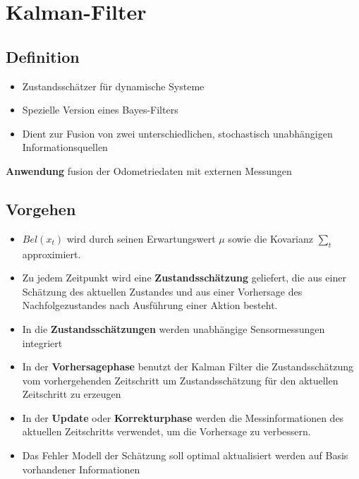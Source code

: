\section{Kalman-Filter}
\subsection{Definition}
\begin{itemize}
	\item Zustandsschätzer für dynamische Systeme
	\item Spezielle Version eines Bayes-Filters
	\item Dient zur Fusion von zwei unterschiedlichen, stochastisch unabhängigen
		Informationsquellen
\end{itemize}

\textbf{Anwendung} fusion der Odometriedaten mit externen Messungen

\subsection{Vorgehen}
\begin{itemize}
	\item $Bel(x_t)$ wird durch seinen Erwartungswert $\mu$ sowie die Kovarianz
		$\sum_t$ approximiert.
	\item Zu jedem Zeitpunkt wird eine \textbf{Zustandsschätzung} geliefert, die
		aus einer Schätzung des aktuellen Zustandes und aus einer Vorhersage des
		Nachfolgezustandes nach Ausführung einer Aktion besteht.
	\item In die \textbf{Zustandsschätzungen} werden unabhängige Sensormessungen
		integriert
	\item In der \textbf{Vorhersagephase} benutzt der Kalman Filter die
		Zustandsschätzung vom vorhergehenden Zeitschritt um Zustandsschätzung für
		den aktuellen Zeitschritt zu erzeugen
	\item In der \textbf{Update} oder \textbf{Korrekturphase} werden die
		Messinformationen des aktuellen Zeitschritts verwendet, um die Vorhersage
		zu verbessern.
	\item Das Fehler Modell der Schätzung soll optimal aktualisiert werden auf
		Basis vorhandener Informationen
\end{itemize}

